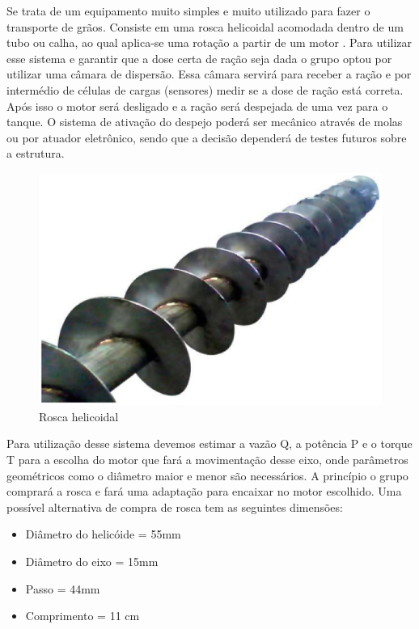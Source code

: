 Se trata de um equipamento muito simples e muito utilizado para fazer o transporte de grãos. Consiste em uma rosca helicoidal acomodada dentro de um tubo ou calha, ao qual aplica-se uma rotação a partir de um motor \cite{ss}. Para utilizar esse sistema e garantir que a dose certa de ração seja dada o grupo optou por utilizar uma câmara de dispersão. Essa câmara servirá para receber a ração e por intermédio de células de cargas (sensores) medir se a dose de ração está correta. Após isso o motor será desligado e a ração será despejada de uma vez para o tanque. O sistema de ativação do despejo poderá ser mecânico através de molas ou por atuador eletrônico, sendo que a decisão dependerá de testes futuros sobre a estrutura.

\begin{figure}[H]
 \centering
   \includegraphics[keepaspectratio=true,scale=0.8]{figuras/rosca.eps}
 \caption{Rosca helicoidal}
 \label{rosca}
\end{figure}

Para utilização desse sistema devemos estimar a vazão Q, a potência P e o torque T para a escolha do motor que fará a movimentação desse eixo, onde parâmetros geométricos como o diâmetro maior e menor são necessários. A princípio o grupo comprará a rosca e fará uma adaptação para encaixar no motor escolhido. Uma possível alternativa de compra de rosca tem as seguintes dimensões:

\begin{itemize}
  \item Diâmetro do helicóide = 55mm
  \item Diâmetro do eixo = 15mm
  \item Passo = 44mm
  \item Comprimento = 11 cm
\end{itemize}

